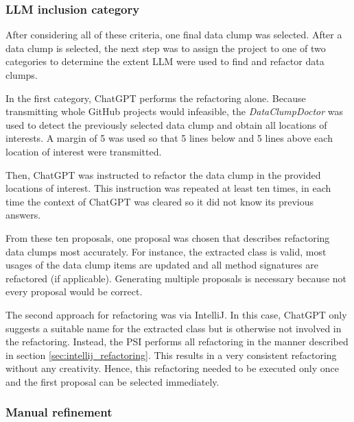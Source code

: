 \subsubsection{LLM inclusion category}

After considering all of these criteria, one final data clump was selected.
After a data clump is selected, the next step was to assign the project to one of two categories to determine the extent \acs{LLM} were used to find and refactor data clumps. 



In the first category, ChatGPT performs the refactoring alone. Because transmitting whole GitHub projects would infeasible, the \textit{DataClumpDoctor} was used to detect the previously selected data clump and obtain all locations of interests. A margin of 5 was used so that 5 lines below and 5 lines above each location of interest were transmitted. 

Then, ChatGPT was instructed to refactor the data clump in the provided locations of interest. This instruction was repeated at least ten times, in each time the context of ChatGPT was cleared so it did not know its previous answers. 

From these ten proposals, one proposal was chosen that describes refactoring data clumps most accurately. For instance, the extracted class is valid, most usages of the data clump items are updated and all method signatures are refactored (if applicable). Generating multiple proposals is necessary because not every proposal would be correct. 



The second approach for refactoring was via IntelliJ. In this case, ChatGPT only suggests a suitable name for the extracted class but is otherwise not involved in the refactoring. Instead, the \ac{PSI} performs all refactoring in the manner described in section  \ref{sec:intellij_refactoring}. This results in a very consistent refactoring without any creativity. Hence, this refactoring needed to be executed only once and the first proposal can be selected immediately. 

\subsubsection{Manual refinement}

